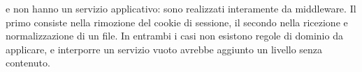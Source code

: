\begin{nota}
 e  non hanno un servizio applicativo: sono realizzati
interamente da middleware. Il primo consiste nella rimozione del cookie di
sessione, il secondo nella ricezione e normalizzazione di un file. In
entrambi i casi non esistono regole di dominio da applicare, e interporre un
servizio vuoto avrebbe aggiunto un livello senza contenuto.
\end{nota}
